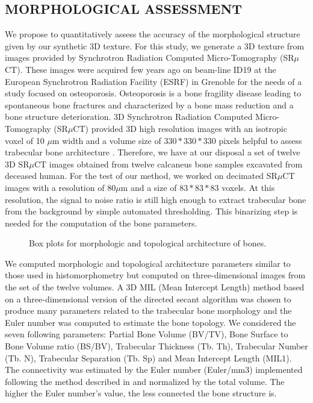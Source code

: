 \subsection{\uppercase{Morphological assessment}}
\label{sec:Morphology}

We propose to quantitatively assess the accuracy of the morphological structure given by our 
synthetic 3D texture. For this study, we generate a 3D texture from images provided 
by Synchrotron Radiation Computed Micro-Tomography (SR$\mu$CT). 
These images were acquired few years ago on beam-line ID19 at the European Synchrotron Radiation Facility 
(ESRF) in Grenoble for the needs of a study focused on osteoporosis. 
Osteoporosis is a bone fragility disease leading to spontaneous bone fractures and 
characterized by a bone mass reduction and a bone structure deterioration. 
3D Synchrotron Radiation Computed Micro-Tomography (SR$\mu$CT) provided 3D high resolution 
images with an isotropic voxel of 10 $\mu$m width and a volume size of 
$330 * 330 * 330$ pixels helpful to assess trabecular bone architecture \cite{revol2002}. 
Therefore, we have at our disposal a set of twelve 3D SR$\mu$CT images obtained from 
twelve calcaneus bone samples excavated from deceased human. 
For the test of our method, we worked on decimated SR$\mu$CT images with a resolution of 
80$\mu$m and a size of $83 * 83 * 83$ voxels. 
At this resolution, the signal to noise ratio is still high enough to extract trabecular 
bone from the background by simple automated thresholding. 
This binarizing step is needed for the computation of the bone parameters.

\begin{figure} 
 \centering  
 \caption{Box plots for morphologic and topological architecture of bones.}
 \label{fig:bone_parametres} 
\end{figure}

We computed morphologic and topological architecture parameters similar to those used in histomorphometry 
but computed on three-dimensional images from the set of the twelve volumes. 
A 3D MIL (Mean Intercept Length) method based on a three-dimensional version of the directed 
secant algorithm was chosen to produce many parameters related to the trabecular 
bone morphology \cite{Hipp97} and the Euler number was computed to estimate the bone topology. 
We considered the seven following parameters: Partial Bone Volume (BV/TV), Bone Surface to 
Bone Volume ratio (BS/BV), Trabecular Thickness (Tb. Th), Trabecular Number (Tb. N), 
Trabecular Separation (Tb. Sp) and Mean Intercept Length (MIL1). The connectivity was estimated by the Euler number 
(Euler/mm3) implemented following the method described in 
\cite{Odgaard93} and normalized by the total volume. 
The higher the Euler number's value, the less connected the bone structure is.


